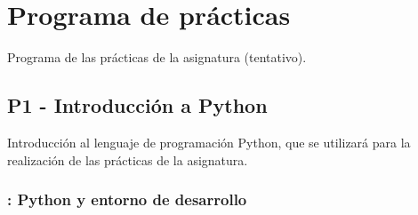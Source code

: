\documentclass[a4paper,12pt]{article}
\begin{document}
\section{Programa de prácticas}

Programa de las prácticas de la asignatura (tentativo).

\subsection{P1 - Introducción a Python}

Introducción al lenguaje de programación Python, que se utilizará para la realización de las prácticas de la asignatura.

\subsubsection{\juevesB: Python y entorno de desarrollo}
\label{cal:juevesB}
\end{document}
